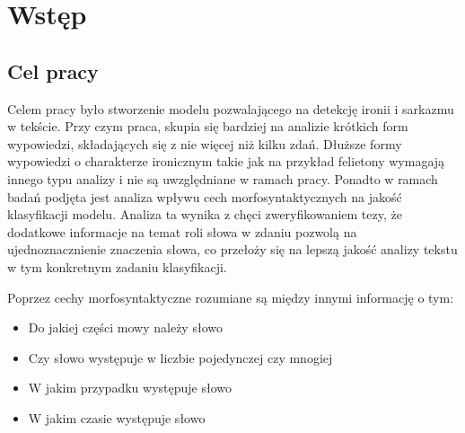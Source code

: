 \newpage %
\section{Wstęp}
\subsection{Cel pracy}

Celem pracy było stworzenie modelu pozwalającego na detekcję ironii i sarkazmu w tekście. Przy czym praca, skupia się bardziej na analizie krótkich form wypowiedzi, składających się z nie więcej niż kilku zdań. Dłuższe formy wypowiedzi o charakterze ironicznym takie jak na przykład felietony wymagają innego typu analizy i nie są uwzględniane w ramach pracy. Ponadto w ramach badań podjęta jest analiza wpływu cech morfosyntaktycznych na jakość klasyfikacji modelu. Analiza ta wynika z chęci zweryfikowaniem tezy, że dodatkowe informacje na temat roli słowa w zdaniu pozwolą na ujednoznacznienie znaczenia słowa, co przełoży się na lepszą jakość analizy tekstu w tym konkretnym zadaniu klasyfikacji.

Poprzez cechy morfosyntaktyczne rozumiane są między innymi informację o tym:
\begin{itemize}
    \item Do jakiej części mowy należy słowo
    \item Czy słowo występuje w liczbie pojedynczej czy mnogiej
    \item W jakim przypadku występuje słowo
    \item W jakim czasie występuje słowo
\end{itemize}





